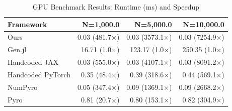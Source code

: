 \begin{table}[htbp]
\centering
\caption{GPU Benchmark Results: Runtime (ms) and Speedup}
\label{tab:gpu-benchmarks}
\begin{tabular}{lrrr}
\toprule
Framework & N=1,000.0 & N=5,000.0 & N=10,000.0 \\
\midrule
Ours & 0.03 (481.7×) & 0.03 (3573.1×) & 0.03 (7254.9×) \\
Gen.jl & 16.71 (1.0×) & 123.17 (1.0×) & 250.35 (1.0×) \\
Handcoded JAX & 0.03 (555.0×) & 0.03 (4107.1×) & 0.03 (8091.2×) \\
Handcoded PyTorch & 0.35 (48.4×) & 0.39 (318.6×) & 0.44 (569.1×) \\
NumPyro & 0.05 (347.4×) & 0.09 (1369.1×) & 0.09 (2668.2×) \\
Pyro & 0.81 (20.7×) & 0.80 (153.1×) & 0.82 (304.9×) \\
\bottomrule
\end{tabular}
\end{table}
